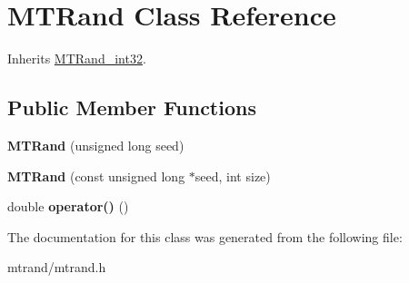 \hypertarget{class_m_t_rand}{
\section{\-M\-T\-Rand \-Class \-Reference}
\label{class_m_t_rand}
}


\-Inherits \hyperlink{class_m_t_rand__int32}{\-M\-T\-Rand\-\_\-int32}.

\subsection*{\-Public \-Member \-Functions}
\begin{DoxyCompactItemize}
\item 
\hypertarget{class_m_t_rand_a2c88736896bcbdb54bcdd7a0026720d5}{
{\bfseries \-M\-T\-Rand} (unsigned long seed)}
\label{class_m_t_rand_a2c88736896bcbdb54bcdd7a0026720d5}

\item 
\hypertarget{class_m_t_rand_a6075a3beacdfb8e4cf48d9fb56cc193a}{
{\bfseries \-M\-T\-Rand} (const unsigned long $\ast$seed, int size)}
\label{class_m_t_rand_a6075a3beacdfb8e4cf48d9fb56cc193a}

\item 
\hypertarget{class_m_t_rand_abbb87a08d622d58fdee0eea4cb5471a0}{
double {\bfseries operator()} ()}
\label{class_m_t_rand_abbb87a08d622d58fdee0eea4cb5471a0}

\end{DoxyCompactItemize}


\-The documentation for this class was generated from the following file\-:\begin{DoxyCompactItemize}
\item 
mtrand/mtrand.\-h\end{DoxyCompactItemize}

